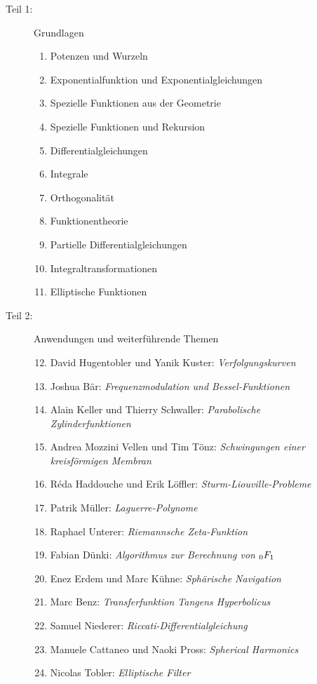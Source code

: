 \documentclass[handout]{beamer}
\begin{document}
\begin{frame}
\begin{columns}[t,onlytextwidth]
\begin{column}{0.65\textwidth}
\begin{description}
\item[Teil 1:] Grundlagen
\begin{enumerate}
\item Potenzen und Wurzeln
\item Exponentialfunktion und Exponentialgleichungen
\item Spezielle Funktionen aus der Geometrie
\item Spezielle Funktionen und Rekursion
\item Differentialgleichungen
\item Integrale
\item Orthogonalität
\item Funktionentheorie
\item Partielle Differentialgleichungen
\item Integraltransformationen
\item Elliptische Funktionen
\end{enumerate}
\item[Teil 2:] Anwendungen und weiterführende Themen
\begin{enumerate}
\setcounter{enumi}{11}
\item David Hugentobler und Yanik Kuster: {\em Verfolgungskurven}
\item Joshua Bär: {\em Frequenzmodulation und Bessel-Funktionen}
\item Alain Keller und Thierry Schwaller: {\em Parabolische Zylinderfunktionen}
\setcounter{enumi}{15}
\item Andrea Mozzini Vellen und Tim Tönz: {\em Schwingungen einer kreisförmigen Membran}
\item Réda Haddouche und Erik Löffler: {\em Sturm-Liouville-Probleme}
\item Patrik Müller: {\em Laguerre-Polynome}
\item Raphael Unterer: {\em Riemannsche Zeta-Funktion}
\item Fabian Dünki: {\em Algorithmus zur Berechnung von $\mathstrut_0F_1$}
\item Enez Erdem und Marc Kühne: {\em Sphärische Navigation}
\item Marc Benz: {\em Transferfunktion Tangens Hyperbolicus}
\item Samuel Niederer: {\em Riccati-Differentialgleichung}
\item Manuele Cattaneo und Naoki Pross: {\em Spherical Harmonics}
\item Nicolas Tobler: {\em Elliptische Filter}
\end{enumerate}
\end{description}
\end{column}
\begin{column}{0.01\textwidth}
\end{column}
\end{columns}
\end{frame}
\end{document}
